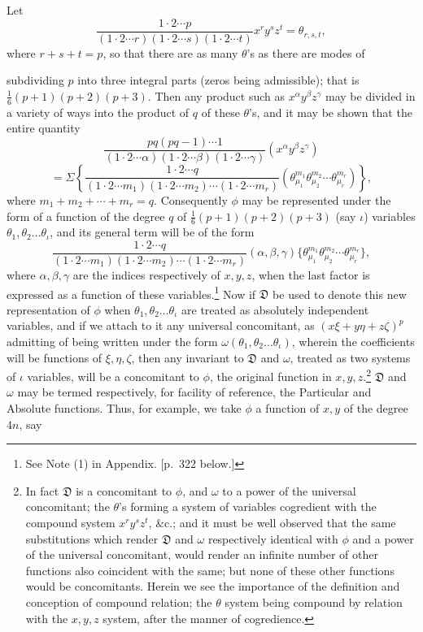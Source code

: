 \documentclass[11pt]{article}
\newcommand{\sourcepage}[1]{\marginpar{\scriptsize p.~#1}}
\begin{document}
{{Let
\[
\frac{1\cdot2\cdots p}{(1\cdot2\cdots r)(1\cdot2\cdots s)(1\cdot2\cdots t)}x^ry^sz^t=\theta_{r,s,t},
\]
where $r+s+t=p$, so that there are as many $\theta$'s as there are modes of

\sourcepage{295}
subdividing $p$ into three integral parts (zeros being admissible); that is $\frac16(p+1)(p+2)(p+3)$. Then any product such as $x^\alpha y^\beta z^\gamma$ may be divided in a variety of ways into the product of $q$ of these $\theta$'s, and it may be shown that the entire quantity
\[
\frac{pq(pq-1)\cdots1}{(1\cdot2\cdots\alpha)(1\cdot2\cdots\beta)(1\cdot2\cdots\gamma)}(x^\alpha y^\beta z^\gamma)
\]
\[
=\Sigma\left\{\frac{1\cdot2\cdots q}{(1\cdot2\cdots m_1)(1\cdot2\cdots m_2)\cdots(1\cdot2\cdots m_r)}
(\theta_{\mu_1}^{m_1}\theta_{\mu_2}^{m_2}\cdots\theta_{\mu_r}^{m_r})\right\},
\]
where $m_1+m_2+\cdots+m_r=q$. Consequently $\phi$ may be represented under the form of a function of the degree $q$ of $\frac16(p+1)(p+2)(p+3)$ (say $\iota$) variables $\theta_1,\theta_2\ldots\theta_\iota$, and its general term will be of the form
\[
\frac{1\cdot2\cdots q}{(1\cdot2\cdots m_1)(1\cdot2\cdots m_2)\cdots(1\cdot2\cdots m_r)}(\alpha,\beta,\gamma)
\{\theta_{\mu_1}^{m_1}\theta_{\mu_2}^{m_2}\cdots\theta_{\mu_r}^{m_r}\},
\]
where $\alpha,\beta,\gamma$ are the indices respectively of $x,y,z$, when the last factor is expressed as a function of these variables.\footnote{See Note (1) in Appendix. [p.~322 below.]} Now if $\mathfrak D$ be used to denote this new representation of $\phi$ when $\theta_1,\theta_2\ldots\theta_\iota$ are treated as absolutely independent variables, and if we attach to it any universal concomitant, as $(x\xi+y\eta+z\zeta)^p$ admitting of being written under the form $\omega(\theta_1,\theta_2\ldots\theta_\iota)$, wherein the coefficients will be functions of $\xi,\eta,\zeta$, then any invariant to $\mathfrak D$ and $\omega$, treated as two systems of $\iota$ variables, will be a concomitant to $\phi$, the original function in $x,y,z$.\footnote{In fact $\mathfrak D$ is a concomitant to $\phi$, and $\omega$ to a power of the universal concomitant; the $\theta$'s forming a system of variables cogredient with the compound system $x^ry^sz^t$, \&c.; and it must be well observed that the same substitutions which render $\mathfrak D$ and $\omega$ respectively identical with $\phi$ and a power of the universal concomitant, would render an infinite number of other functions also coincident with the same; but none of these other functions would be concomitants. Herein we see the importance of the definition and conception of compound relation; the $\theta$ system being compound by relation with the $x,y,z$ system, after the manner of cogredience.} $\mathfrak D$ and $\omega$ may be termed respectively, for facility of reference, the Particular and Absolute functions. Thus, for example, we take $\phi$ a function of $x,y$ of the degree $4n$, say
}}
\end{document}
